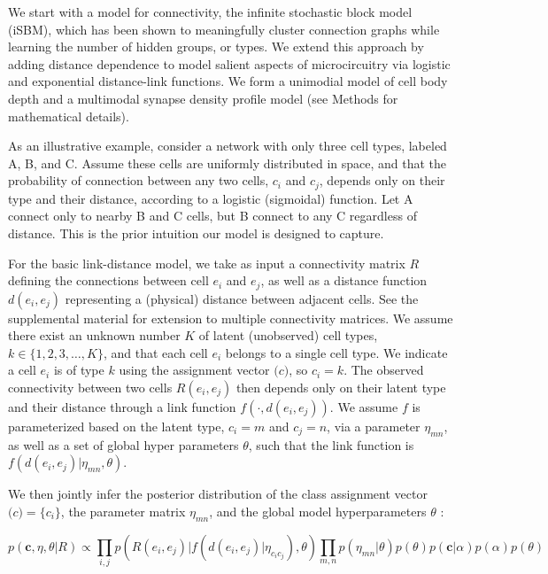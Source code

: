 \documentclass{article}
\renewcommand{\vec}[1]{\mathbf{#1}}
\begin{document}
We start with a model for connectivity, the infinite stochastic block
model (iSBM)\autocite{Kemp2006a,Xu2006}, which has been shown to
meaningfully cluster connection graphs while learning the number of
hidden groups, or types. We extend this approach by adding distance
dependence to model salient aspects of microcircuitry via logistic and
exponential distance-link functions.  We form a unimodial model of cell
body depth and a multimodal synapse density profile model (see
Methods for mathematical details).

As an illustrative example, consider a network with only three cell
types, labeled A, B, and C. Assume these cells are uniformly
distributed in space, and that the probability of connection between
any two cells, $c_i$ and $c_j$, depends only on their type and their
distance, according to a logistic (sigmoidal) function. Let A connect
only to nearby B and C cells, but B connect to any C regardless of
distance. This is the prior intuition our model is designed to capture. 


For the basic link-distance model, we take as input a connectivity
matrix $R$ defining the connections between cell $e_i$ and $e_j$, as
well as a distance function $d(e_i, e_j)$ representing a (physical)
distance between adjacent cells.  See
the supplemental material for extension to multiple connectivity
matrices. We assume there exist an unknown number $K$ of latent
(unobserved) cell types, $k \in \{1, 2, 3, \dots, K\}$, and that each
cell $e_i$ belongs to a single cell type. We indicate a cell $e_i$ is
of type $k$ using the assignment vector $\vec(c)$, so $c_i = k$. The
observed connectivity between two cells $R(e_i, e_j)$ then depends
only on their latent type and their distance through a link function
$f(\cdot, d(e_i, e_j))$. We assume $f$ is parameterized based on the
latent type, $c_i=m$ and $c_j=n$, via a parameter $\eta_{mn}$, as well
as a set of global hyper parameters $\theta$, such that the link
function is $f(d(e_i, e_j) | \eta_{mn}, \theta)$.

We then jointly infer the posterior distribution of the
class assignment vector $\vec(c) = \{c_i\}$, the parameter matrix
$\eta_{mn}$, and the global model hyperparameters $\theta$ :

\begin{equation}
  p(\vec{c}, \eta, \theta | R ) \propto \prod_{i, j} p(R(e_i, e_j) | f(d(e_i, e_j) | \eta_{c_ic_j}), \theta) \prod_{m, n} p(\eta_{mn} | \theta)  p(\theta) p(\vec{c} | \alpha) p(\alpha) p(\theta)
\end{equation}
\end{document}

